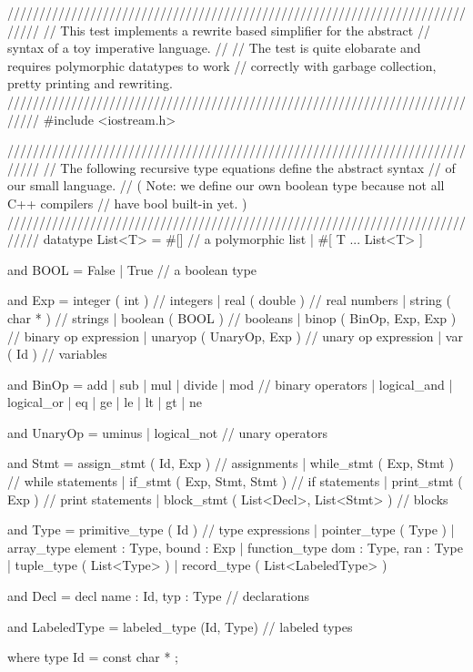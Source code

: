 
\begin{prop}
/////////////////////////////////////////////////////////////////////////////
//  This test implements a rewrite based simplifier for the abstract
//  syntax of a toy imperative language.  
//
//  The test is quite elobarate and requires polymorphic datatypes to work 
//  correctly with garbage collection, pretty printing and rewriting. 
/////////////////////////////////////////////////////////////////////////////
#include <iostream.h>

/////////////////////////////////////////////////////////////////////////////
//  The following recursive type equations define the abstract syntax
//  of our small language.
//  ( Note: we define our own boolean type because not all C++ compilers
//    have bool built-in yet. )
/////////////////////////////////////////////////////////////////////////////
datatype List<T> = #[]                             // a polymorphic list
                 | #[ T ... List<T> ]         

and      BOOL    = False | True                    // a boolean type

and      Exp     = integer ( int )                 // integers
                 | real    ( double )              // real numbers
                 | string  ( char * )              // strings
                 | boolean ( BOOL )                // booleans
                 | binop   ( BinOp, Exp, Exp )     // binary op expression
                 | unaryop ( UnaryOp, Exp )        // unary op expression 
                 | var     ( Id )                  // variables

and      BinOp   = add | sub | mul | divide | mod  // binary operators
                 | logical_and | logical_or     
                 | eq  | ge | le | lt | gt | ne

and      UnaryOp = uminus | logical_not            // unary operators

and      Stmt    = assign_stmt ( Id, Exp )                // assignments
                 | while_stmt  ( Exp, Stmt )              // while statements
                 | if_stmt     ( Exp, Stmt, Stmt )        // if statements
                 | print_stmt  ( Exp )                    // print statements
                 | block_stmt  ( List<Decl>, List<Stmt> ) // blocks

and      Type    = primitive_type ( Id )                  // type expressions
                 | pointer_type   ( Type )
                 | array_type     { element : Type, bound : Exp }
                 | function_type  { dom : Type, ran : Type }
                 | tuple_type     ( List<Type> ) 
                 | record_type    ( List<LabeledType> ) 

and      Decl    = decl { name : Id, typ : Type }        // declarations

and  LabeledType = labeled_type (Id, Type)               // labeled types

where type Id    = const char *
;   
\end{prop}

